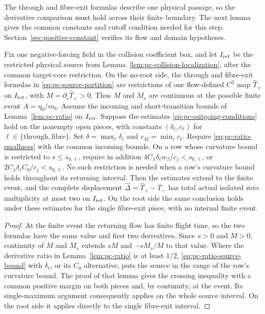 

The through and fibre-exit formulas describe one physical passage, so
the derivative comparison must hold across their finite boundary. The
next lemma gives the common constants and cutoff condition needed for
this step. Section~\ref{sec:positive-constant} verifies its flow and
domain hypotheses.

\begin{lemma}
\label{lem:pc-event-gluing}
Fix one negative-forcing field in the collision coefficient box, and let
$I_{\rm ret}$ be the restricted physical source from
Lemma~\ref{lem:pc-collision-localization}, after the common target-core
restriction. On the no-root side, the through and fibre-exit formulas in
\eqref{eq:pc-source-partition} are restrictions of one flow-defined
$C^2$ map $\widehat T_+$ on $I_{\rm ret}$, with
$M=\partial_s\widehat T_+>0$. Thus $M$ and $M_s$ are continuous at
the possible finite event $A=\eta_0/m_b$.
Assume the incoming and short-transition bounds of
Lemma~\ref{lem:pc-ratio} on $I_{\rm ret}$.
Suppose the estimates \eqref{eq:pc-outgoing-conditions} hold on the
nonempty open pieces, with
constants $(\delta_\ell,c_\ell)$ for
$\ell\in\{\mathrm{through},\mathrm{fibre}\}$. Set
$\delta=\max_\ell\delta_\ell$ and $c_M=\min_\ell c_\ell$.
Require \eqref{eq:pc-ratio-smallness} with the common incoming bounds.
On a row whose curvature bound is restricted to $s\le s_{0,\ell}$,
require in addition
$4C_\lambda\delta_\ell w_\beta/c_j<s_{0,\ell}$, or
$2C_\lambda\delta_\ell C_0/c_j<s_{0,\ell}$.
No such restriction is needed when a row's curvature bound holds
throughout its returning interval.
Then the estimates extend to the finite event, and the complete displacement
$\widehat\Delta=\widehat T_+-T_-$ has total actual isolated zero multiplicity
at most two on $I_{\rm ret}$. On the root side the same conclusion
holds under these estimates for the single fibre-exit piece, with no
internal finite event.
\end{lemma}
\begin{proof}
At the finite event the returning flow has finite flight time, so the
two formulas have the same value and first two derivatives.
Since $s>0$ and $M>0$, continuity of $M$ and $M_s$ extends
$sM$ and $-sM_s/M$ to that value. Where the derivative ratio in
Lemma~\ref{lem:pc-ratio} is at least $1/2$,
\eqref{eq:pc-ratio-source-bound} with $\delta_\ell$, or its $C_0$
alternative, puts the source in the range of the row's curvature bound.
The proof of that lemma
gives the crossing inequality with a common positive margin on both
pieces and, by continuity, at the event. Its single-maximum argument consequently
applies on the whole source interval. On the root side it applies
directly to the single fibre-exit interval.
\end{proof}
